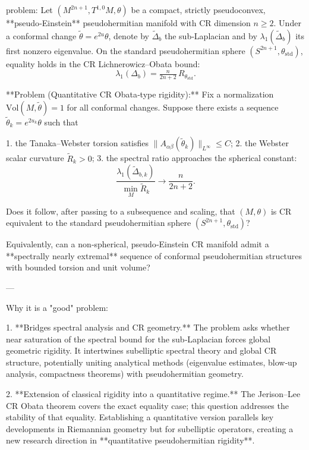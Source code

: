 problem:  
Let \((M^{2n+1}, T^{1,0}M, \theta)\) be a compact, strictly pseudoconvex, **pseudo‑Einstein** pseudohermitian manifold with CR dimension \(n\ge2\).  
Under a conformal change \(\tilde{\theta}=e^{2u}\theta\), denote by \(\tilde{\Delta}_b\) the sub‑Laplacian and by \(\lambda_1(\tilde{\Delta}_b)\) its first nonzero eigenvalue.  
On the standard pseudohermitian sphere \((S^{2n+1},\theta_{\mathrm{std}})\), equality holds in the CR Lichnerowicz–Obata bound:  
\[
\lambda_1(\Delta_b) = \tfrac{n}{2n+2}\,R_{\theta_{\mathrm{std}}}.
\]

**Problem (Quantitative CR Obata‑type rigidity):**  
Fix a normalization \(\mathrm{Vol}(M,\tilde{\theta})=1\) for all conformal changes.  
Suppose there exists a sequence \(\tilde{\theta}_k=e^{2u_k}\theta\) such that  

1. the Tanaka–Webster torsion satisfies \( \|A_{\alpha\beta}(\tilde{\theta}_k)\|_{L^\infty}\le C\);  
2. the Webster scalar curvature \(\tilde{R}_k>0\);  
3. the spectral ratio approaches the spherical constant:
   \[
   \frac{\lambda_1(\tilde{\Delta}_{b,k})}{\min_M \tilde{R}_k}\longrightarrow \frac{n}{2n+2}.
   \]  

Does it follow, after passing to a subsequence and scaling, that \((M,\theta)\) is CR equivalent to the standard pseudohermitian sphere \((S^{2n+1},\theta_{\mathrm{std}})\)?  

Equivalently, can a non‑spherical, pseudo‑Einstein CR manifold admit a **spectrally nearly extremal** sequence of conformal pseudohermitian structures with bounded torsion and unit volume?

---

Why it is a "good" problem:

1. **Bridges spectral analysis and CR geometry.**  
   The problem asks whether near saturation of the spectral bound for the sub‑Laplacian forces global geometric rigidity. It intertwines subelliptic spectral theory and global CR structure, potentially uniting analytical methods (eigenvalue estimates, blow‑up analysis, compactness theorems) with pseudohermitian geometry.

2. **Extension of classical rigidity into a quantitative regime.**  
   The Jerison–Lee CR Obata theorem covers the exact equality case; this question addresses the stability of that equality. Establishing a quantitative version parallels key developments in Riemannian geometry but for subelliptic operators, creating a new research direction in **quantitative pseudohermitian rigidity**.


